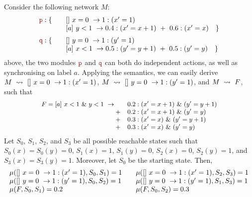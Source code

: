 \begin{exa}
  Consider the following network $M$:
  \begin{displaymath}
    \begin{array}{llll}
      \role{p}: \{ & \quad \commandBase {}{x=0} {1:(x'=1)}\\
                   & \quad \commandBase {a}{y<1} {0.4: (x'=x+1)\ +\ 0.6: (x'=x)}\quad \}\\[2mm]
      \role{q}: \{ & \quad \commandBase {}{y=0} {1:(y'=1)}\\
                   & \quad \commandBase {a}{x<1} {0.5: (y'=y+1)\ +\ 0.5: (y'=y)}\quad \}\\
    \end{array}
  \end{displaymath}
  above, the two modules $\role p$ and $\role q$ can both do
  independent actions, as well as synchronising on label $a$. Applying
  the semantics, we can easily derive
  $M\ \stackrel{}{\rightsquigarrow}\ []\ x=0\ \rightarrow 1:(x'=1)$,
  $M\ \stackrel{}{\rightsquigarrow}\ []\ y=0\ \rightarrow 1:(y'=1)$, and $M\ \stackrel{}{\rightsquigarrow}\ F$,
  such that
  \begin{displaymath}\small
    \begin{array}{rlll}
      F=\commandBase {a}{x<1\ \&\ y<1} {\quad} & 0.2: (x'=x+1)\ \&\ (y'=y+1)\\
                                       + & 0.2: (x'=x+1)\ \&\ (y'=y)\\
                                       + & 0.3: (x'=x)\ \&\ (y'=y+1)\\
                                       + & 0.3: (x'=x)\ \&\ (y'=y)\\
    \end{array}
  \end{displaymath}  
  Let $S_0$, $S_1$, $S_2$, and $S_3$ be all possible reachable states
  such that
  $S_0(x)=S_0(y)=0$, $S_1(x)=1$, $S_1(y)=0$, $S_2(x)=0$, $S_2(y)=1$,
  and $S_3(x)=S_3(y)=1$.
  Moreover, let $S_0$ be the starting state. Then, %
  \begin{displaymath}
    \begin{array}{ll}
      \mu([]\ x=0\ \rightarrow 1:(x'=1), S_0, S_1) = 1
      & \quad \mu([]\ x=0\ \rightarrow 1:(x'=1), S_2, S_3) = 1\\
      \mu([]\ y=0\ \rightarrow 1:(y'=1), S_0, S_2) = 1
      & \quad \mu([]\ y=0\ \rightarrow 1:(y'=1), S_1, S_3) = 1\\ 
      \mu(F, S_0, S_1) = 0.2 &\quad\mu(F, S_0, S_2) = 0.3\\

\end{array}
\end{displaymath}
\end{exa}

